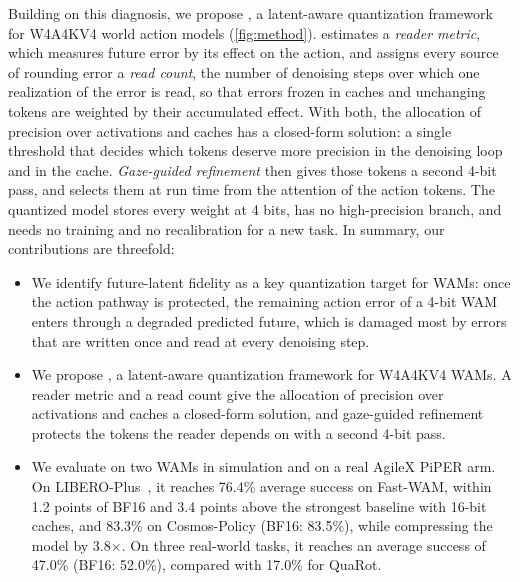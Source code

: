 Building on this diagnosis, we propose \method, a latent-aware quantization framework for W4A4KV4 world action models (\cref{fig:method}).
\method estimates a \emph{reader metric}, which measures future error by its effect on the action, and assigns every source of rounding error a \emph{read count}, the number of denoising steps over which one realization of the error is read, so that errors frozen in caches and unchanging tokens are weighted by their accumulated effect.
With both, the allocation of precision over activations and caches has a closed-form solution: a single threshold that decides which tokens deserve more precision in the denoising loop and in the cache.
\emph{Gaze-guided refinement} then gives those tokens a second 4-bit pass, and selects them at run time from the attention of the action tokens.
The quantized model stores every weight at 4 bits, has no high-precision branch, and needs no training and no recalibration for a new task.
In summary, our contributions are threefold:
\begin{itemize}
  \item We identify future-latent fidelity as a key quantization target for WAMs: once the action pathway is protected, the remaining action error of a 4-bit WAM enters through a degraded predicted future, which is damaged most by errors that are written once and read at every denoising step.
  \item We propose \method, a latent-aware quantization framework for W4A4KV4 WAMs. A reader metric and a read count give the allocation of precision over activations and caches a closed-form solution, and gaze-guided refinement protects the tokens the reader depends on with a second 4-bit pass.
  \item We evaluate \method on two WAMs in simulation and on a real AgileX PiPER arm. On LIBERO-Plus~\cite{fei2026liberoplus}, it reaches 76.4\% average success on Fast-WAM, within 1.2 points of BF16 and 3.4 points above the strongest baseline with 16-bit caches, and 83.3\% on Cosmos-Policy (BF16: 83.5\%), while compressing the model by 3.8$\times$. On three real-world tasks, it reaches an average success of 47.0\% (BF16: 52.0\%), compared with 17.0\% for QuaRot.
\end{itemize}
